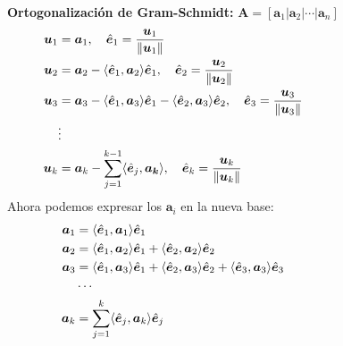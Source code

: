 \documentclass[9pt, aspectratio=169]{beamer}
\begin{document}
\begin{frame}
\begin{columns}[t]
		\cx
		\textbf{Ortogonalización de Gram-Schmidt:} $\bm{A} = [\bm{a}_1 | \bm{a}_2 | \cdots | \bm{a}_n]$
		{\small
			\begin{align*}
				\bm{u}_1 & = \bm{a}_1, \quad \hat{\bm{e}}_1 = \frac{\bm{u}_1}{\lVert\bm{u}_1 \rVert}                                                                                                     \\
				\bm{u}_2 & = \bm{a}_2 - \langle \hat{\bm{e}}_1, \bm{a}_2 \rangle \hat{\bm{e}}_1, \quad \hat{\bm{e}}_2 = \frac{\bm{u}_2}{\lVert\bm{u}_2 \rVert}                                                   \\
				\bm{u}_3 & = \bm{a}_3 - \langle \hat{\bm{e}}_1, \bm{a}_3 \rangle \hat{\bm{e}}_1 - \langle \hat{\bm{e}}_2, \bm{a}_3 \rangle \hat{\bm{e}}_2, \quad \hat{\bm{e}}_3 = \frac{\bm{u}_3}{\lVert\bm{u}_3 \rVert} \\
				         & \vdots                                                                                                                                                                    \\
				\bm{u}_k & = \bm{a}_k - \sum_{j=1}^{k-1} \langle \hat{\bm{e}}_j, \bm{a_k} \rangle, \quad \hat{\bm{e}}_k = \frac{\bm{u}_k}{\lVert \bm{u}_k \rVert}
			\end{align*} \pause
			Ahora podemos expresar los $\bm{a}_i$ en la nueva base:
			\begin{align*}
				\bm{a}_1 & = \langle \hat{\bm{e}}_1, \bm{a}_1 \rangle \hat{\bm{e}}_1                                                                                                     \\
				\bm{a}_2 & = \langle \hat{\bm{e}}_1, \bm{a}_2 \rangle \hat{\bm{e}}_1 + \langle \hat{\bm{e}}_2, \bm{a}_2 \rangle \hat{\bm{e}}_2                                                   \\
				\bm{a}_3 & = \langle \hat{\bm{e}}_1, \bm{a}_3 \rangle \hat{\bm{e}}_1 + \langle \hat{\bm{e}}_2, \bm{a}_3 \rangle \hat{\bm{e}}_2 + \langle \hat{\bm{e}}_3, \bm{a}_3 \rangle \hat{\bm{e}}_3 \\
				         & \cdots                                                                                                                                                \\
				\bm{a}_k & = \sum_{j=1}^k \langle \hat{\bm{e}}_j, \bm{a}_k \rangle \hat{\bm{e}}_j
			\end{align*}
		}
	\end{columns}
\end{frame}
\end{document}
